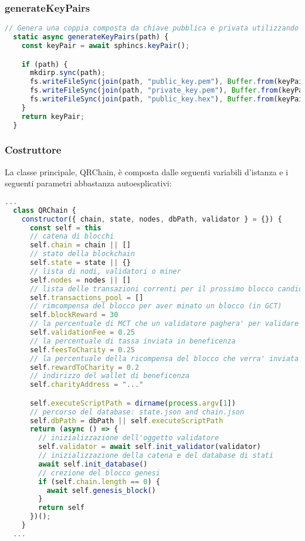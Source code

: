 \subsubsection{generateKeyPairs}
\begin{lstlisting}[language=JavaScript,breaklines]
  // Genera una coppia composta da chiave pubblica e privata utilizzando l'algoritmo SPHINCS
  static async generateKeyPairs(path) {
    const keyPair = await sphincs.keyPair();

    if (path) {
      mkdirp.sync(path);
      fs.writeFileSync(join(path, "public_key.pem"), Buffer.from(keyPair.publicKey).toString('hex'));
      fs.writeFileSync(join(path, "private_key.pem"), Buffer.from(keyPair.privateKey).toString('hex'));
      fs.writeFileSync(join(path, "public_key.hex"), Buffer.from(keyPair.publicKey).toString('hex'));
    }
    return keyPair;
  }
\end{lstlisting}

\subsubsection{Costruttore}
La classe principale, QRChain, è composta dalle seguenti variabili d'istanza e i seguenti parametri abbastanza autoesplicativi:

\begin{lstlisting}[language=JavaScript,breaklines]
  ...
  class QRChain {
    constructor({ chain, state, nodes, dbPath, validator } = {}) {
      const self = this
      // catena di blocchi
      self.chain = chain || []
      // stato della blockchain
      self.state = state || {}
      // lista di nodi, validatori o miner
      self.nodes = nodes || [] 
      // lista delle transazioni correnti per il prossimo blocco candidato
      self.transactions_pool = []
      // rimcompensa del blocco per aver minato un blocco (in GCT)
      self.blockReward = 30
      // la percentuale di MCT che un validatore paghera' per validare un blocco
      self.validationFee = 0.25
      // la percentuale di tassa inviata in beneficenza
      self.feesToCharity = 0.25
      // la percentuale della ricompensa del blocco che verra' inviata in beneficenza
      self.rewardToCharity = 0.2
      // indirizzo del wallet di beneficenza
      self.charityAddress = "..." 

      self.executeScriptPath = dirname(process.argv[1])
      // percorso del database: state.json and chain.json
      self.dbPath = dbPath || self.executeScriptPath 
      return (async () => {
        // inizializzazione dell'oggetto validatore
        self.validator = await self.init_validator(validator)
        // inizializzazione della catena e del database di stati
        await self.init_database()
        // crezione del blocco genesi
        if (self.chain.length == 0) {
          await self.genesis_block()
        }
        return self
      })();
    }
  ...
\end{lstlisting}

